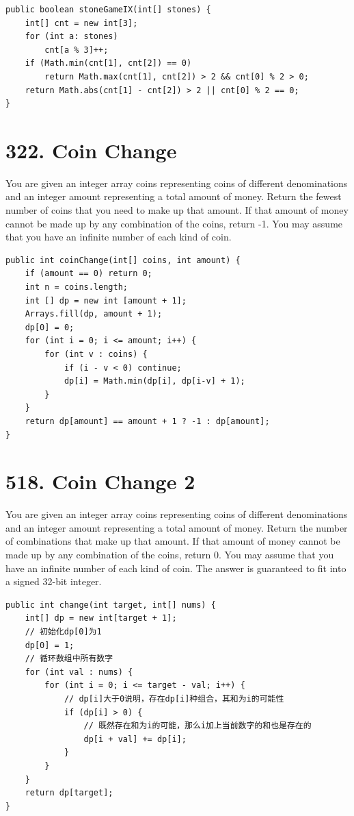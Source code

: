 \documentclass[9pt, b5paaper]{book}
\begin{document}
\begin{verbatim}
public boolean stoneGameIX(int[] stones) {
    int[] cnt = new int[3];
    for (int a: stones)
        cnt[a % 3]++;
    if (Math.min(cnt[1], cnt[2]) == 0)
        return Math.max(cnt[1], cnt[2]) > 2 && cnt[0] % 2 > 0;
    return Math.abs(cnt[1] - cnt[2]) > 2 || cnt[0] % 2 == 0;
}
\end{verbatim}
\section{322. Coin Change}
\label{sec-2-23}
You are given an integer array coins representing coins of different denominations and an integer amount representing a total amount of money.
Return the fewest number of coins that you need to make up that amount. If that amount of money cannot be made up by any combination of the coins, return -1.
You may assume that you have an infinite number of each kind of coin.
\begin{verbatim}
public int coinChange(int[] coins, int amount) {
    if (amount == 0) return 0;
    int n = coins.length;
    int [] dp = new int [amount + 1];
    Arrays.fill(dp, amount + 1);
    dp[0] = 0;
    for (int i = 0; i <= amount; i++) {
        for (int v : coins) {
            if (i - v < 0) continue;
            dp[i] = Math.min(dp[i], dp[i-v] + 1);
        }
    }
    return dp[amount] == amount + 1 ? -1 : dp[amount];
}
\end{verbatim}

\section{518. Coin Change 2}
\label{sec-2-24}
You are given an integer array coins representing coins of different denominations and an integer amount representing a total amount of money.
Return the number of combinations that make up that amount. If that amount of money cannot be made up by any combination of the coins, return 0.
You may assume that you have an infinite number of each kind of coin.
The answer is guaranteed to fit into a signed 32-bit integer.
\begin{verbatim}
public int change(int target, int[] nums) {
    int[] dp = new int[target + 1];
    // 初始化dp[0]为1
    dp[0] = 1;
    // 循环数组中所有数字
    for (int val : nums) {
        for (int i = 0; i <= target - val; i++) {
            // dp[i]大于0说明，存在dp[i]种组合，其和为i的可能性
            if (dp[i] > 0) {
                // 既然存在和为i的可能，那么i加上当前数字的和也是存在的
                dp[i + val] += dp[i];
            }
        }
    }
    return dp[target];
}
\end{verbatim}
\end{document}
